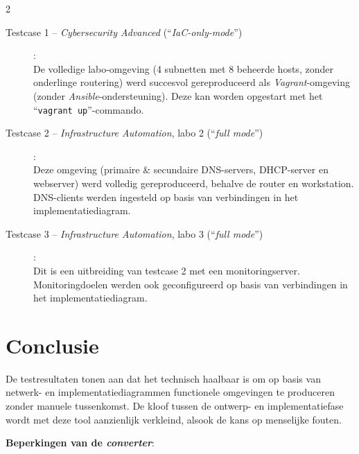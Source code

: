 \documentclass[a0,portrait]{hogent-poster}
\begin{document}
\begin{multicols}{2}
      \begin{description}
            \item[Testcase 1 -- \emph{Cybersecurity Advanced} (``\textcolor{hogent-orange}{\emph{IaC-only-mode}}'')]:\\De volledige labo-omgeving (4 subnetten met 8 beheerde hosts, zonder onderlinge routering) werd succesvol gereproduceerd als \emph{Vagrant}-omgeving (zonder \emph{Ansible}-ondersteuning). Deze kan worden opgestart met het ``\texttt{vagrant up}''-commando.
            \item[Testcase 2 -- \emph{Infrastructure Automation}, labo 2 (``\textcolor{hogent-darkgreen}{\emph{full mode}}'')]:\\Deze omgeving (primaire \& secundaire DNS-servers, DHCP-server en \\webserver) werd volledig gereproduceerd, behalve de router en workstation.\\DNS-clients werden ingesteld op basis van verbindingen in het implementatiediagram.
            \item[Testcase 3 -- \emph{Infrastructure Automation}, labo 3 (``\textcolor{hogent-darkgreen}{\emph{full mode}}'')]:\\Dit is een uitbreiding van testcase 2 met een monitoringserver.\\Monitoringdoelen werden ook geconfigureerd op basis van verbindingen in het implementatiediagram.
      \end{description}
      \section{Conclusie}

      De testresultaten tonen aan dat het technisch haalbaar is om op basis van netwerk- en implementatiediagrammen functionele omgevingen te produceren zonder manuele tussenkomst. De kloof tussen de ontwerp- en implementatiefase wordt met deze tool aanzienlijk verkleind, alsook de kans op menselijke fouten.

      \smallskip

      \textbf{Beperkingen van de \emph{converter}}:


\end{multicols}
\end{document}
